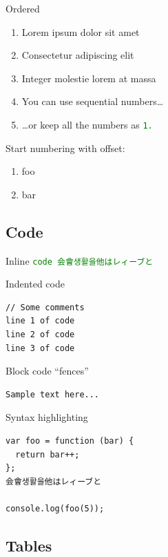 \documentclass[
  paper=a4,
  ,captions=tableheading
]{scrartcl}
\providecommand{\tightlist}{%
  \setlength{\itemsep}{0pt}\setlength{\parskip}{0pt}}
\begin{document}
Ordered

\begin{enumerate}
\def\labelenumi{\arabic{enumi}.}
\item
  Lorem ipsum dolor sit amet
\item
  Consectetur adipiscing elit
\item
  Integer molestie lorem at massa
\item
  You can use sequential numbers\ldots{}
\item
  \ldots or keep all the numbers as \textcolor{green}{\lstinline{1.}}
\end{enumerate}

Start numbering with offset:

\begin{enumerate}
\def\labelenumi{\arabic{enumi}.}
\setcounter{enumi}{56}
\tightlist
\item
  foo
\item
  bar
\end{enumerate}

\hypertarget{code}{%
\subsection{Code}\label{code}}

Inline \textcolor{green}{\lstinline{code 会會생활을他はレィーブと}}

Indented code

\begin{lstlisting}
// Some comments
line 1 of code
line 2 of code
line 3 of code
\end{lstlisting}

Block code ``fences''

\begin{lstlisting}
Sample text here...
\end{lstlisting}

Syntax highlighting

\begin{lstlisting}
var foo = function (bar) {
  return bar++;
};
会會생활을他はレィーブと

console.log(foo(5));
\end{lstlisting}

\hypertarget{tables}{%
\subsection{Tables}\label{tables}}
\end{document}
